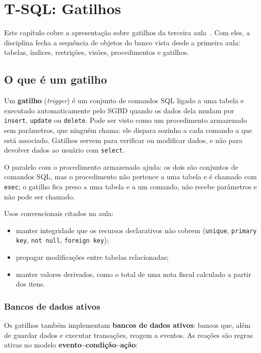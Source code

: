 \setchapterpreamble[u]{\margintoc}
\chapter{T-SQL: Gatilhos}

Este capítulo cobre a apresentação sobre gatilhos da terceira
aula~\cite{BaiocoCET615}. Com eles, a disciplina fecha a sequência de
objetos do banco vista desde a primeira aula: tabelas, índices,
restrições, visões, procedimentos e gatilhos.

\section{O que é um gatilho}

Um \textbf{gatilho} (\emph{trigger}) é um conjunto de
comandos SQL ligado a uma tabela e executado automaticamente pelo SGBD
quando os dados dela mudam por \texttt{insert}, \texttt{update} ou
\texttt{delete}. Pode ser visto como um procedimento armazenado sem
parâmetros, que ninguém chama: ele dispara sozinho a cada comando a que
está associado. Gatilhos servem para verificar ou modificar dados, e não
para devolver dados ao usuário com \texttt{select}.

O paralelo com o procedimento armazenado ajuda: os dois são conjuntos
de comandos SQL, mas o procedimento não pertence a uma tabela e é
chamado com \texttt{exec}; o gatilho fica preso a uma tabela e a um
comando, não recebe parâmetros e não pode ser chamado.

Usos convencionais citados na aula:

\begin{itemize}
	\item manter integridade que os recursos declarativos não cobrem
	(\texttt{unique}, \texttt{primary key}, \texttt{not null},
	\texttt{foreign key});
	\item propagar modificações entre tabelas relacionadas;
	\item manter valores derivados, como o total de uma nota fiscal
	calculado a partir dos itens.
\end{itemize}

\subsection{Bancos de dados ativos}

Os gatilhos também implementam \textbf{bancos de dados ativos}: bancos
que, além de guardar dados e executar transações, reagem a eventos. As
reações são regras ativas no modelo \textbf{evento--condição--ação}:

